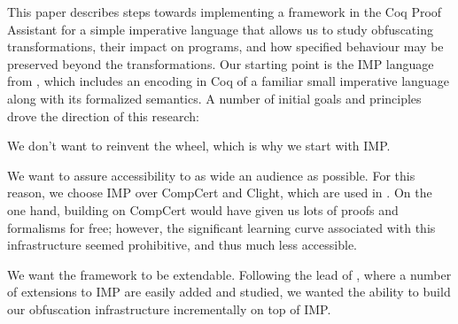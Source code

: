 \documentclass[compsoc,conference,a4paper,10pt,times]{IEEEtran}
\begin{document}
This paper describes steps towards implementing a framework in the Coq Proof Assistant \cite{Coq} for a simple imperative language that allows us to study obfuscating transformations, their impact on programs, and how specified behaviour may be preserved beyond the transformations. Our starting point is the IMP language from \cite{SFV2}, which includes an encoding in Coq of a familiar small imperative language along with its formalized semantics.
A number of initial goals and principles drove the direction of this research: 
 \begin{enumerate*}
  \item We don't want to reinvent the wheel, which is why we start with IMP.
  \item We want to assure accessibility to as wide an audience as possible. For this reason, we choose IMP over CompCert and Clight, which are used in \cite{Blazy2}.  On the one hand, building on CompCert would have given us lots of proofs and formalisms for free; however, the significant learning curve associated with this infrastructure seemed prohibitive, and thus much less accessible.\label{goal2}
  \item We want the framework to be extendable.  Following the lead of \cite{SFV2}, where a number of extensions to IMP are easily added and studied, we wanted the ability to build our obfuscation infrastructure incrementally on top of IMP.\label{goal3}
  \end{enumerate*}
\end{document}
